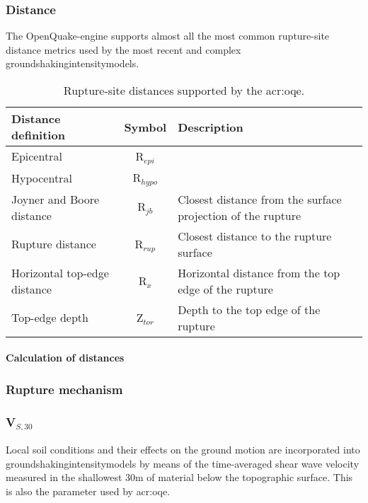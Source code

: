 \subsubsection{Distance}
%
The OpenQuake-engine supports almost all the most common rupture-site 
distance metrics used by the most recent and complex 
\glspl{groundshakingintensitymodel}. 
%
\begin{table}[!b]
\centering
\begin{tabular}{p{5cm}cp{5cm}}
\hline
\rowcolor{anti-flashwhite}
\bf{Distance definition} & \bf{Symbol} & \bf{Description} \\
\hline 
Epicentral & R$_{epi}$ & \\
Hypocentral & R$_{hypo}$ & \\
Joyner and Boore distance & R$_{jb}$ & Closest distance from the surface 
    projection of the rupture \\
Rupture distance & R$_{rup}$ & Closest distance to the rupture surface \\
Horizontal top-edge distance & R$_{x}$ & Horizontal distance from the top 
    edge of the rupture \\
Top-edge depth & Z$_{tor}$ & Depth to the top edge of the rupture \\
\hline
\end{tabular}
\caption{Rupture-site distances supported by the \gls{acr:oqe}.}
\end{table}
%
\paragraph{Calculation of distances}
%
\subsubsection{Rupture mechanism}
%
\subsubsection{V$_{S,30}$}
%
Local soil conditions and their effects on the ground motion are incorporated
into \glspl{groundshakingintensitymodel} by means of the time-averaged shear
wave velocity measured in the shallowest 30m of material below the topographic
surface. This is also the parameter used by \gls{acr:oqe}.

